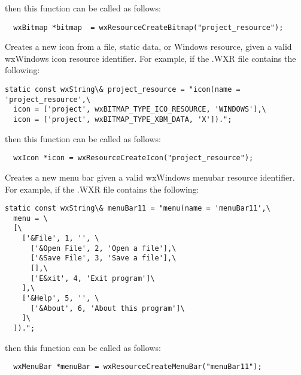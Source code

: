then this function can be called as follows:

\begin{verbatim}
  wxBitmap *bitmap  = wxResourceCreateBitmap("project_resource");
\end{verbatim}

\label{wxresourcecreateicon}


Creates a new icon from a file, static data, or Windows resource, given a valid
wxWindows icon resource identifier. For example, if the .WXR file contains
the following:

\begin{verbatim}
static const wxString\& project_resource = "icon(name = 'project_resource',\
  icon = ['project', wxBITMAP_TYPE_ICO_RESOURCE, 'WINDOWS'],\
  icon = ['project', wxBITMAP_TYPE_XBM_DATA, 'X']).";
\end{verbatim}

then this function can be called as follows:

\begin{verbatim}
  wxIcon *icon = wxResourceCreateIcon("project_resource");
\end{verbatim}

\label{wxresourcecreatemenubar}


Creates a new menu bar given a valid wxWindows menubar resource
identifier. For example, if the .WXR file contains the following:

\begin{verbatim}
static const wxString\& menuBar11 = "menu(name = 'menuBar11',\
  menu = \
  [\
    ['&File', 1, '', \
      ['&Open File', 2, 'Open a file'],\
      ['&Save File', 3, 'Save a file'],\
      [],\
      ['E&xit', 4, 'Exit program']\
    ],\
    ['&Help', 5, '', \
      ['&About', 6, 'About this program']\
    ]\
  ]).";
\end{verbatim}

then this function can be called as follows:

\begin{verbatim}
  wxMenuBar *menuBar = wxResourceCreateMenuBar("menuBar11");
\end{verbatim}


\label{wxresourcegetidentifier}


